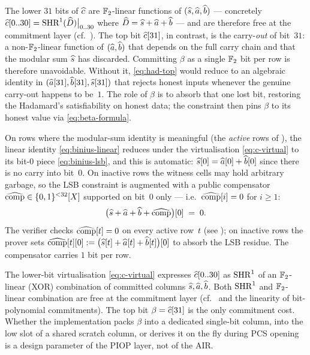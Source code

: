 \begin{remark}\label{rem:beta-needed}
The lower $31$ bits of $\widehat{c}$ are $\mathbb{F}_2$-linear functions of
$(\widehat{s}, \widehat{a}, \widehat{b})$ — concretely $\widehat{c}[0..30] = \operatorname{SHR}^{1}(\widehat{D})
\big|_{0..30}$ where $\widehat{D} = \widehat{s} + \widehat{a} + \widehat{b}$ — and are
therefore free at the commitment layer (cf.\ ).
The top bit $\widehat{c}[31]$, in contrast, is the carry-\emph{out} of
bit~$31$: a non-$\mathbb{F}_2$-linear function of $(\widehat{a}, \widehat{b})$ that
depends on the full carry chain and that the modular sum $\widehat{s}$ has
discarded. Committing $\beta$ as a single $\mathbb{F}_2$ bit per row is
therefore unavoidable. Without it, \eqref{eq:had-top} would reduce to
an algebraic identity in $(\widehat{a}[31], \widehat{b}[31], \widehat{s}[31])$ that
rejects honest inputs whenever the genuine carry-out happens to
be~$1$. The role of $\beta$ is to absorb that one lost bit, restoring
the Hadamard's satisfiability on honest data; the constraint then
pins $\beta$ to its honest value via \eqref{eq:beta-formula}.
\end{remark}

\begin{remark}\label{rem:bin-lsb-comp}
On rows where the modular-sum identity is meaningful (the
\emph{active} rows of ), the linear identity
\eqref{eq:binius-linear} reduces under the virtualisation
\eqref{eq:c-virtual} to its bit-$0$ piece \eqref{eq:binius-lsb}, and
this is automatic: $\widehat{s}[0] = \widehat{a}[0] + \widehat{b}[0]$ since there is
no carry into bit~$0$. On inactive rows the witness cells may hold
arbitrary garbage, so the LSB constraint is augmented with a public
compensator $\widehat{\mathrm{comp}} \in \{0,1\}^{<32}[X]$ supported on bit~$0$
only — i.e.\ $\widehat{\mathrm{comp}}[i] = 0$ for $i \geq 1$:
\begin{equation}\label{eq:lsb-comp}
\bigl(\widehat{s} + \widehat{a} + \widehat{b} + \widehat{\mathrm{comp}}\bigr)[0] \;=\; 0.
\end{equation}
The verifier checks $\widehat{\mathrm{comp}}[t] = 0$ on every active row~$t$
(see ); on inactive rows the prover sets
$\widehat{\mathrm{comp}}[t][0] := \bigl(\widehat{s}[t] + \widehat{a}[t] + \widehat{b}[t]
\bigr)[0]$ to absorb the LSB residue. The compensator carries $1$
bit per row.
\end{remark}

\begin{remark}
\label{rem:c-virtual}
The lower-bit virtualisation \eqref{eq:c-virtual} expresses
$\widehat{c}[0..30]$ as $\operatorname{SHR}^{1}$ of an $\mathbb{F}_2$-linear (XOR) combination
of committed columns $\widehat{s}, \widehat{a}, \widehat{b}$. Both $\operatorname{SHR}^{1}$ and
$\mathbb{F}_2$-linear combination are free at the commitment layer
(cf.\  and the linearity of bit-polynomial
commitments). The top bit $\beta = \widehat{c}[31]$ is the only commitment
cost. Whether the implementation packs $\beta$ into a dedicated
single-bit column, into the low slot of a shared scratch column, or
derives it on the fly during PCS opening is a design parameter of the
PIOP layer, not of the AIR.
\end{remark}


